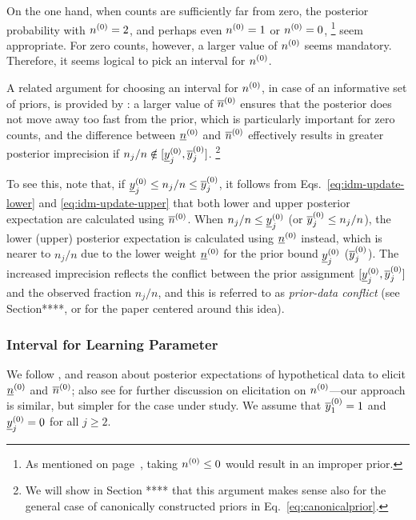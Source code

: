 On the one hand, when counts are sufficiently far from zero,
the posterior probability with $n^{(0)}=2$, and perhaps even $n^{(0)}=1$ or $n^{(0)}=0$,%
\footnote{As mentioned on page~\pageref{eq:canonicalprior},
taking $n^{(0)} \le 0$ would result in an improper prior.}
seem appropriate.
For zero counts, however, a larger value of $n^{(0)}$ seems mandatory.
Therefore, it seems logical to pick an interval for $n^{(0)}$.

A related argument for choosing an interval for $n^{(0)}$,
in case of an informative set of priors,
is provided by \textcite[p.~225, \S 5.4.4]{1991:walley}:
a larger value of $\overline{n}^{(0)}$ ensures that the posterior does not move away too fast from the prior,
which is particularly important for zero counts,
and the difference between $\underline{n}^{(0)}$ and $\overline{n}^{(0)}$ effectively results in greater posterior
imprecision if $n_j/n \notin [\underline{y}^{(0)}_j,\overline{y}^{(0)}_j]$.%
\footnote{We will show in Section **** that this argument makes sense
also for the general case of canonically constructed priors in Eq.~\eqref{eq:canonicalprior}.}

To see this, note that, if $\underline{y}^{(0)}_j \le n_j/n \le \overline{y}^{(0)}_j$, it follows from
Eqs.~\eqref{eq:idm-update-lower} and \eqref{eq:idm-update-upper}
that both lower and upper posterior expectation are calculated using $\overline{n}^{(0)}$.
When $n_j/n \le \underline{y}^{(0)}_j$ (or $\overline{y}^{(0)}_j \le n_j/n$),
the lower (upper) posterior expectation is calculated using $\underline{n}^{(0)}$ instead,
which is nearer to $n_j/n$ due to the lower weight $\underline{n}^{(0)}$ for the prior bound $\underline{y}^{(0)}_j$ ($\overline{y}^{(0)}_j$).
The increased imprecision reflects the conflict between the prior assignment
$[\underline{y}^{(0)}_j,\overline{y}^{(0)}_j]$ and the observed fraction $n_j/n$,
and this is referred to as \emph{prior-data conflict}
(see Section****, or \textcite{Walter2009a} for the paper centered around this idea).

\subsubsection{Interval for Learning Parameter}

We follow \textcite[p.~19]{1965:good} \parencite[as suggested by][Note~5.4.1, p.~524]{1991:walley},
and reason about posterior expectations of hypothetical data to elicit $\underline{n}^{(0)}$ and $\overline{n}^{(0)}$;
also see \textcite[p.~219, \S 5.3.3]{1991:walley} for further
discussion on elicitation on $n^{(0)}$---our approach is similar, but simpler for the case under study.
We assume that $\overline{y}^{(0)}_1=1$ and $\underline{y}^{(0)}_j=0$ for all $j\ge 2$.

